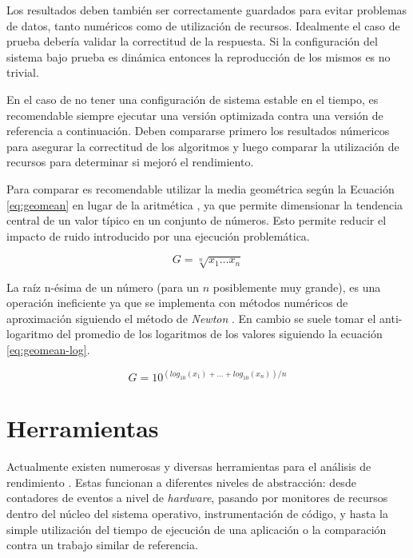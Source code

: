 \documentclass[a4paper]{report}
\begin{document}
Los resultados deben también ser correctamente guardados para evitar problemas de datos, tanto numéricos como de utilización de recursos. Idealmente el caso de prueba debería validar la correctitud de la respuesta. Si la configuración del sistema bajo prueba es dinámica entonces la reproducción de los mismos es no trivial.

\bigskip

En el caso de no tener una configuración de sistema estable en el tiempo, es recomendable siempre ejecutar una versión optimizada contra una versión de referencia a continuación. Deben compararse primero los resultados númericos para asegurar la correctitud de los algoritmos y luego comparar la utilización de recursos para determinar si mejoró el rendimiento.

\bigskip

Para comparar es recomendable utilizar la media geométrica según la Ecuación \ref{eq:geomean} en lugar de la aritmética \cite{how-not-to-lie}, ya que permite dimensionar la tendencia central de un valor típico en un conjunto de números. Esto permite reducir el impacto de ruido introducido por una ejecución problemática.

\begin{equation}
\label{eq:geomean}
G = \sqrt[n]{x_{1} \ldots x_{n}}
\end{equation}

La raíz n-ésima de un número (para un $ n $ posiblemente muy grande), es una operación ineficiente ya que se implementa con métodos numéricos de aproximación siguiendo el método de {\it Newton} \cite{numerical-analysis}. En cambio se suele tomar el anti-logaritmo del promedio de los logaritmos de los valores siguiendo la ecuación \ref{eq:geomean-log}.

\begin{equation}
\label{eq:geomean-log}
G = 10 ^{( log _{10} (x_{1}) + \ldots + log _{10} (x_{n}) ) / n}
\end{equation}

\section{Herramientas}

Actualmente existen numerosas y diversas herramientas para el análisis de rendimiento \cite{gregg}. Estas funcionan a diferentes niveles de abstracción: desde contadores de eventos a nivel de {\it hardware}, pasando por monitores de recursos dentro del núcleo del sistema operativo, instrumentación de código, y hasta la simple utilización del tiempo de ejecución de una aplicación o la comparación contra un trabajo similar de referencia. 
\end{document}
